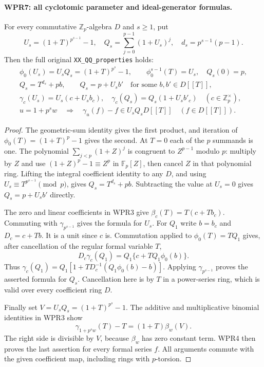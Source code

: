 \documentclass[11pt,a4paper]{article}
\numberwithin{equation}{section}
\theoremstyle{remark}\newtheorem{remark}[theorem]{Remark}
\begin{document}
\paragraph{WPR7: all cyclotomic parameter and ideal-generator formulas.}
\label{claim:WPR7}
For every commutative $\mathbb Z_p$-algebra $D$ and $s\geq1$, put
\[
 U_s=(1+T)^{p^{s-1}}-1,\quad
 Q_s=\sum_{j=0}^{p-1}(1+U_s)^j,\quad d_s=p^{s-1}(p-1).
 \tag{WPR.9}
\]
Then the full original \texttt{XX\_\allowbreak QQ\_\allowbreak properties} holds:
\[
 \begin{gathered}
 \phi_0(U_s)=U_sQ_s=(1+T)^{p^s}-1,
 \qquad \phi_0^{s-1}(T)=U_s,\quad Q_s(0)=p,\\
 Q_s=T^{d_s}+p b,\qquad Q_s=p+U_s b'
                    \quad\text{for some }b,b'\in D[[T]],\\
 \gamma_c(U_s)=U_s(c+U_s b_c),\quad
 \gamma_c(Q_s)=Q_s(1+U_s b'_c)\quad(c\in\mathbb Z_p^\times),\\
 u=1+p^s w\quad\Longrightarrow\quad
         \gamma_u(f)-f\in U_sQ_sD[[T]]\quad(f\in D[[T]]).
 \end{gathered}                                                     \tag{WPR.10}
\]

\begin{proof}
The geometric-sum identity gives the first product, and iteration
of $\phi_0(T)=(1+T)^p-1$ gives the second. At $T=0$ each of the
$p$ summands is one. The polynomial
$\sum_{j<p}(1+Z)^j$ is congruent to $Z^{p-1}$ modulo $p$:
multiply by $Z$ and use $(1+Z)^p-1\equiv Z^p$ in
$\mathbb F_p[Z]$, then cancel $Z$ in that polynomial ring.
Lifting the integral coefficient identity to any $D$, and using
$U_s\equiv T^{p^{s-1}}\pmod p$, gives
$Q_s=T^{d_s}+pb$. Subtracting the value at $U_s=0$ gives
$Q_s=p+U_sb'$ directly.

The zero and linear coefficients in WPR3 give
$\beta_c(T)=T(c+Tb_c)$. Commuting with $\gamma_{p^{s-1}}$
gives the formula for $U_s$. For $Q_1$ write $b=b_c$ and
$D_c=c+Tb$. It is a unit since $c$ is. Commutation applied to
$\phi_0(T)=TQ_1$ gives, after cancellation of the regular
formal variable $T$,
\[
 D_c\gamma_c(Q_1)=Q_1\{c+TQ_1\phi_0(b)\}.
\]
Thus
$\gamma_c(Q_1)=Q_1[1+TD_c^{-1}(Q_1\phi_0(b)-b)]$.
Applying $\gamma_{p^{s-1}}$ proves the asserted formula for
$Q_s$. Cancellation here is by $T$ in a power-series ring,
which is valid over every coefficient ring $D$.

Finally set $V=U_sQ_s=(1+T)^{p^s}-1$. The additive and
multiplicative binomial identities in WPR3 show
\[
 \gamma_{1+p^s w}(T)-T=(1+T)\beta_w(V).
\]
The right side is divisible by $V$, because $\beta_w$ has
zero constant term. WPR4 then proves the last assertion for
every formal series $f$. All arguments commute with the given
coefficient map, including rings with $p$-torsion.
\end{proof}
\end{document}

